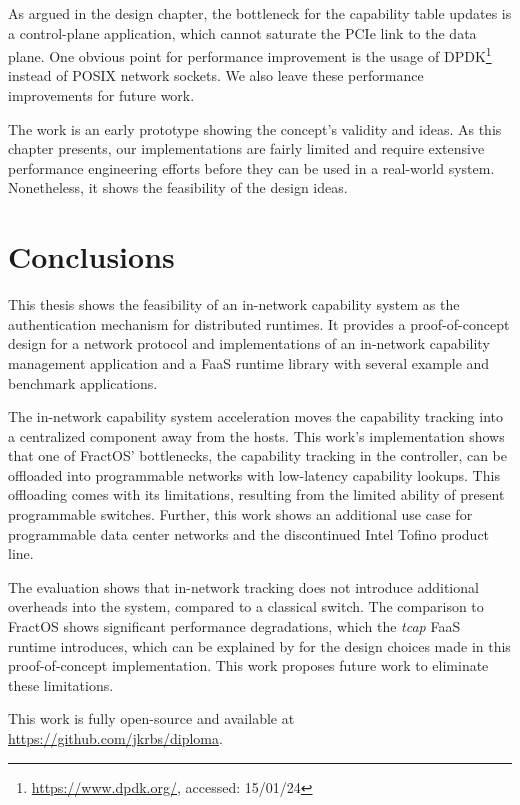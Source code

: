 As argued in the design chapter, the bottleneck for the capability table updates is a control-plane application, which cannot saturate the \ac{PCIe} link to the data plane. One obvious point for performance improvement is the usage of \ac{DPDK}\footnote{\url{https://www.dpdk.org/}, accessed: 15/01/24} instead of \ac{POSIX} network sockets. We also leave these performance improvements for future work.

The work is an early prototype showing the concept's validity and ideas. 
As this chapter presents, our implementations are fairly limited and require extensive performance engineering efforts before they can be used in a real-world system. Nonetheless, it shows the feasibility of the design ideas.

\chapter{Conclusions}
This thesis shows the feasibility of an in-network capability system as the authentication mechanism for distributed runtimes. It provides a proof-of-concept design for a network protocol and implementations of an in-network capability management application and a \ac{FaaS} runtime library with several example and benchmark applications.

The in-network capability system acceleration moves the capability tracking into a centralized component away from the hosts. This work's implementation shows that one of FractOS' bottlenecks, the capability tracking in the controller, can be offloaded into programmable networks with low-latency capability lookups. This offloading comes with its limitations, resulting from the limited ability of present programmable switches. Further, this work shows an additional use case for programmable data center networks and the discontinued Intel Tofino product line.

The evaluation shows that in-network tracking does not introduce additional overheads into the system, compared to a classical switch. The comparison to FractOS shows significant performance degradations, which the \emph{tcap} \ac{FaaS} runtime introduces, which can be explained by for the design choices made in this proof-of-concept implementation. This work proposes future work to eliminate these limitations.

This work is fully open-source and available at \url{https://github.com/jkrbs/diploma}\@.
